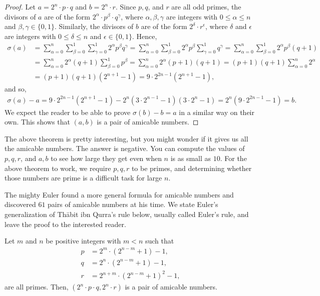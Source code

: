 \documentclass[12pt]{subfile}
\begin{document}
	\begin{proof}
		Let $a=2^n\cdot p \cdot q$ and  $b=2^n\cdot r$. Since $p, q$, and $r$ are all odd primes, the divisors of $a$ are of the form $2^{\alpha}\cdot p^{\beta} \cdot q^{\gamma}$, where $\alpha, \beta, \gamma $ are integers with $0\leq \alpha \leq n$ and $\beta, \gamma \in \{0, 1\}$. Similarly, the divisors of $b$ are of the form $2^{\delta} \cdot r^{\epsilon}$, where $\delta$ and $\epsilon$ are integers with $0 \leq \delta \leq n$ and $\epsilon \in \{0,1\}$. Hence,
		\begin{align*}
			\sigma(a) &= \sum_{\alpha=0}^{n} \sum_{\beta=0}^{1} \sum_{\gamma=0}^1 2^{\alpha} p^{\beta}  q^{\gamma} = \sum_{\alpha=0}^{n} \sum_{\beta=0}^{1} 2^{\alpha} p^{\beta}   \sum_{\gamma=0}^1 q^{\gamma}   = \sum_{\alpha=0}^{n} \sum_{\beta=0}^{1} 2^{\alpha} p^{\beta}   (q+1) \\
			&= \sum_{\alpha=0}^{n} 2^{\alpha} (q+1) \sum_{\beta=0}^{1} p^{\beta} = \sum_{\alpha=0}^{n} 2^{\alpha} (p+1)(q+1) = (p+1)(q+1)  \sum_{\alpha=0}^{n} 2^{\alpha} \\
			&=  (p+1)(q+1) \left(2^{n+1} - 1\right) = 9 \cdot 2^{2n-1} \left(2^{n+1} - 1\right),
		\end{align*}
		and so,
		\begin{align*}
			\sigma(a)-a =  9 \cdot 2^{2n-1} \left(2^{n+1} - 1\right) - 2^n \left(3 \cdot 2^{n-1} - 1\right) \left(3 \cdot 2^{n} - 1\right) = 2^n \left(9 \cdot 2^{2n-1}-1\right) = b.
		\end{align*}
		We expect the reader to be able to prove $\sigma(b)-b=a$ in a similar way on their own. This shows that $(a,b)$ is a pair of amicable numbers.
	\end{proof}

	The above theorem is pretty interesting, but you might wonder if it gives us all the amicable numbers. The answer is negative. You can compute the values of $p, q, r$, and $a,b$ to see how large they get even when $n$ is as small as $10$. For the above theorem to work, we require $p,q,r$ to be primes, and determining whether those numbers are prime is a difficult task for large $n$.

	The mighty Euler \textcite[Chapter I, Page $42$]{dickson_1952} found a more general formula for amicable numbers and discovered $61$ pairs of amicable numbers at his time. We state Euler's generalization of Th\={a}bit ibn Qurra's rule below, usually called Euler's rule, and leave the proof to the interested reader.

	\begin{theorem}
		Let $m$ and $n$ be positive integers with $m<n$ such that
		\begin{align*}
			p & = 2^m \cdot \left(2^{n-m}+1\right) - 1,\\
			q & = 2^n \cdot  \left(2^{n-m}+1\right)  - 1,\\
			r & = 2^{n+m}\cdot  \left(2^{n-m}+1\right)^2  - 1,
		\end{align*}
		are all primes. Then, $(2^n\cdot p \cdot q,  2^n\cdot r)$ is a pair of amicable numbers.
	\end{theorem}
\end{document}
